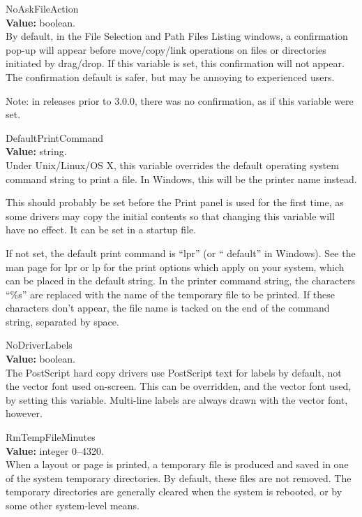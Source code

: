 \begin{description}
\item{\et NoAskFileAction}\\
{\bf Value:} boolean.\\
By default, in the {\cb File Selection} and {\cb Path Files Listing}
windows, a confirmation pop-up will appear before move/copy/link
operations on files or directories initiated by drag/drop.  If this
variable is set, this confirmation will not appear.  The confirmation
default is safer, but may be annoying to experienced users.

Note:  in releases prior to 3.0.0, there was no confirmation, as
if this variable were set.

\item{\et DefaultPrintCommand}\\
{\bf Value:} string.\\
Under Unix/Linux/OS X, this variable overrides the default operating
system command string to print a file.  In Windows, this will be the
printer name instead.

This should probably be set before the {\cb Print} panel is used for
the first time, as some drivers may copy the initial contents so that
changing this variable will have no effect.  It can be set in a
startup file.

If not set, the default print command is ``{\vt lpr}'' (or ``{\vt
default}'' in Windows).  See the man page for {\vt lpr} or {\vt lp}
for the print options which apply on your system, which can be placed
in the default string.  In the printer command string, the characters
``{\vt \%s}'' are replaced with the name of the temporary file to be
printed.  If these characters don't appear, the file name is tacked on
the end of the command string, separated by space.

\item{\et NoDriverLabels}\\
{\bf Value:} boolean.\\
The PostScript hard copy drivers use PostScript text for labels by
default, not the vector font used on-screen.  This can be overridden,
and the vector font used, by setting this variable.  Multi-line labels
are always drawn with the vector font, however.

\item{\et RmTempFileMinutes}\\
{\bf Value:} integer 0--4320.\\
When a layout or page is printed, a temporary file is produced and
saved in one of the system temporary directories.  By default, these
files are not removed.  The temporary directories are generally
cleared when the system is rebooted, or by some other system-level
means.


\end{description}
